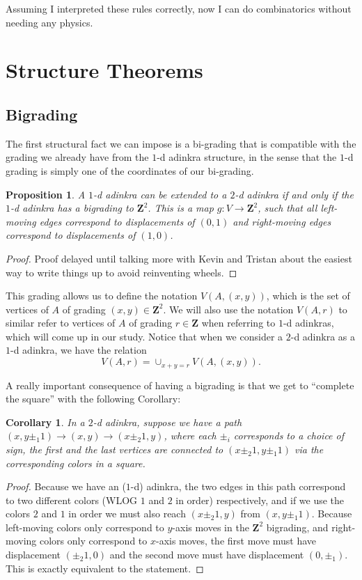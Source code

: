 \documentclass[12pt,twoside,singlespace]{article}
\numberwithin{equation}{section}
\newtheorem{cor}[equation]{Corollary}
\newtheorem{prop}[equation]{Proposition}
\theoremstyle{definition}
\newcommand{\ZZ}{\mathbf{Z}}
\begin{document}
Assuming I interpreted these rules correctly, now I can do combinatorics without needing any physics.

\section{Structure Theorems}

\subsection{Bigrading}

The first structural fact we can impose is a bi-grading that is compatible with the grading we already have from the $1$-d adinkra structure, in the sense that the $1$-d grading is simply one of the coordinates of our bi-grading.

\begin{prop}
A $1$-d adinkra can be extended to a $2$-d adinkra if and only if the $1$-d adinkra has a \emph{bigrading} to $\ZZ^2$. This is a map $g: V \rightarrow \ZZ^2$, such that all left-moving edges correspond to displacements of $(0, 1)$ and right-moving edges correspond to displacements of $(1, 0)$.
\end{prop}

\begin{proof}
Proof delayed until talking more with Kevin and Tristan about the easiest way to write things up to avoid reinventing wheels.
\end{proof}

This grading allows us to define the notation $V(A, (x,y))$, which is the set of vertices of $A$ of grading $(x,y) \in \ZZ^2$. We will also use the notation $V(A, r)$ to similar refer to vertices of $A$ of grading $r \in \ZZ$ when referring to $1$-d adinkras, which will come up in our study. Notice that when we consider a $2$-d adinkra as a $1$-d adinkra, we have the relation
\[
V(A,r) = \cup_{x + y = r} V(A, (x,y)).
\]

A really important consequence of having a bigrading is that we get to ``complete the square'' with the following Corollary:

\begin{cor}
\label{cor:square}
In a $2$-d adinkra, suppose we have a path $(x, y \pm_1 1) \rightarrow (x, y) \rightarrow (x \pm_2 1, y)$, where each $\pm_i$ corresponds to a choice of sign, the first and the last vertices are connected to $(x \pm_2 1, y \pm_1 1)$ via the corresponding colors in a square.
\end{cor}
\begin{proof}
Because we have an ($1$-d) adinkra, the two edges in this path correspond to two different colors (WLOG $1$ and $2$ in order) respectively, and if we use the colors $2$ and $1$ in order we must also reach $(x \pm_2 1, y)$ from $(x, y \pm_1 1)$. Because left-moving colors only correspond to $y$-axis moves in the $\ZZ^2$ bigrading, and right-moving colors only correspond to $x$-axis moves, the first move must have displacement $(\pm_2 1, 0)$ and the second move must have displacement $(0, \pm_1)$. This is exactly equivalent to the statement.
\end{proof}
\end{document}
